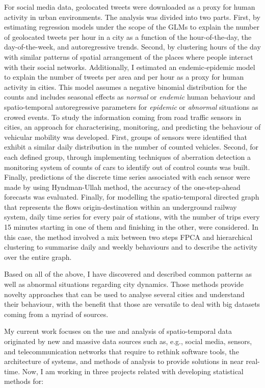 \documentclass[11pt, a4paper]{awesome-cv}
\begin{document}
\begin{cvletter}
For social media data, geolocated tweets were downloaded as a proxy for human activity in urban environments. The analysis was divided into two parts. First, by estimating regression models under the scope of the GLMs to explain the number of geolocated tweets per hour in a city as a function of the hour-of-the-day, the day-of-the-week, and autoregressive trends. Second, by clustering hours of the day with similar patterns of spatial arrangement of the places where people interact with their social networks. Additionally, I estimated an endemic-epidemic model to explain the number of tweets per area and per hour as a proxy for human activity in cities. This model assumes a negative binomial distribution for the counts and includes seasonal effects as \emph{normal} or \emph{endemic} human behaviour and spatio-temporal autoregressive parameters for \emph{epidemic} or \emph{abnormal} situations as crowed events. To study the information coming from road traffic sensors in cities, an approach for characterising, monitoring, and predicting the behaviour of vehicular mobility was developed. First, groups of sensors were identified that exhibit a similar daily distribution in the number of counted vehicles. Second, for each defined group, through implementing techniques of aberration detection a monitoring system of counts of cars to identify out of control counts was built. Finally, predictions of the discrete time series associated with each sensor were made by using Hyndman-Ullah method, the accuracy of the one-step-ahead forecasts was evaluated. Finally, for modelling the spatio-temporal directed graph that represents the flows origin-destination within an underground railway system, daily time series for every pair of stations, with the number of trips every 15 minutes starting in one of them and finishing in the other, were considered. In this case, the method involved a mix between two steps FPCA and hierarchical clustering to summarise daily and weekly behaviours and to describe the activity over the entire graph.\par
Based on all of the above, I have discovered and described common patterns as well as abnormal situations regarding city dynamics. Those methods provide novelty approaches that can be used to analyse several cities and understand their behaviour, with the benefit that those are versatile to deal with big datasets coming from a myriad of sources.\par My current work focuses on the use and analysis of spatio-temporal data originated by new and massive data sources such as, e.g., social media, sensors, and telecommunication networks that require to rethink software tools, the architecture of systems, and methods of analysis to provide solutions in near real-time. Now, I am working in three projects related with developing statistical methods for:

\end{cvletter}
\end{document}
